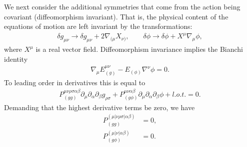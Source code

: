 \documentclass{ws-ijmpd}
\begin{document}
We next consider the additional 
symmetries that come from the action being covariant
(diffeomorphism invariant).
That is, the physical content of the equations of motion are
left invariant by the transformations:
\begin{align}
   \delta g_{\mu\nu}
   \to
   \delta g_{\mu\nu}
   +
   2\nabla_{(\mu}X_{\nu)}
   ,
   \qquad
   \delta\phi
   \to
   \delta\phi
   +
   X^{\mu}\nabla_{\mu}\phi
   ,
\end{align}
where $X^{\mu}$ is a real vector field.
Diffeomorphism invariance implies the Bianchi identity
\begin{align}
   \nabla_{\mu}E^{\mu\nu}_{(g)}
   -
   E_{(\phi)}
   \nabla^{\nu}\phi
   =
   0
   .
\end{align}
To leading order in derivatives this is equal to
\begin{align}
   P_{(gg)}^{\mu\nu\rho\sigma\alpha\beta}
   \partial_{\mu}\partial_{\alpha}\partial_{\beta}g_{\rho\sigma}
   +
   P_{(g\phi)}^{\mu\nu\alpha\beta}
   \partial_{\mu}\partial_{\alpha}\partial_{\beta}\phi
   +
   l.o.t.
   =
   0
   .
\end{align}
Demanding that the highest derivative terms be zero, we have
\begin{subequations}
\begin{align}
   P_{(gg)}^{(\mu|\nu\rho\sigma|\alpha\beta)}
   &=
   0
   ,\\
   P_{(g\phi)}^{(\mu|\nu|\alpha\beta)}
   &=
   0
   .
\end{align}
\end{subequations}
\end{document}
